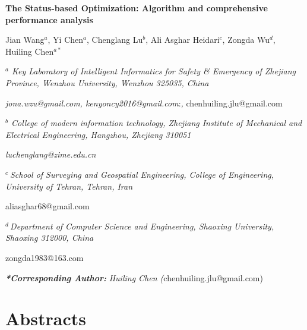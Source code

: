 \documentclass{article} %
\begin{document}


\noindent \textbf{The Status-based Optimization: Algorithm and comprehensive performance analysis}

Jian Wang${}^{a}$, Yi Chen${}^{a}$, Chenglang Lu${}^{b}$, Ali Asghar Heidari${}^{c}$, Zongda Wu${}^{d}$, Huiling Chen${}^{a*}$


\noindent \textit{${}^{a}$ Key Laboratory of Intelligent Informatics for Safety \& Emergency of Zhejiang Province, Wenzhou University, Wenzhou 325035, China}

\noindent \textit{jona.wzu@gmail.com, kenyoncy2016@gmail.com}:\textit{, }chenhuiling.jlu@gmail.com\textit{\underbar{}}

\noindent \textit{${}^{b}$ College of modern information technology, Zhejiang Institute of Mechanical and Electrical Engineering, Hangzhou, Zhejiang 310051}

\noindent \textit{luchenglang@zime.edu.cn}

\noindent \textit{${}^{c}$${}^{\ }$School of Surveying and Geospatial Engineering, College of Engineering, University of Tehran, Tehran, Iran}

\noindent aliasghar68@gmail.com\textit{\underbar{}}

\textit{${}^{d\ }$Department of Computer Science and Engineering, Shaoxing University, Shaoxing 312000, China}

\noindent zongda1983@163.com

\noindent \textit{}

\noindent \textbf{\textit{*Corresponding Author: }}\textit{Huiling Chen (}chenhuiling.jlu@gmail.com)\textbf{}

\noindent 
\section{Abstracts}
\end{document}
